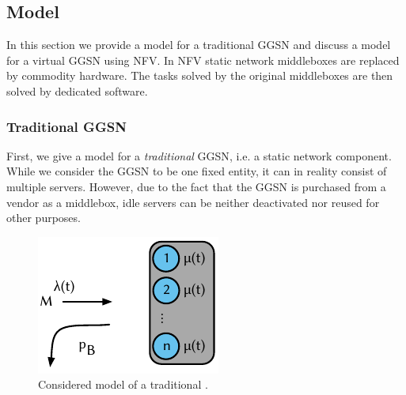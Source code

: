 \subsection{Model}\label{sec:cloud:virtualized_network_functions:model}

In this section we provide a model for a traditional \gls{GGSN} and discuss a model for a virtual \gls{GGSN} using \gls{NFV}.
In \gls{NFV} \cite{Nfv2013} static network middleboxes are replaced by commodity hardware.
The tasks solved by the original middleboxes are then solved by dedicated software.

\subsubsection*{Traditional GGSN}\label{sec:cloud:virtualized_network_functions:model:traditional_ggsn}
First, we give a model for a \emph{traditional} \gls{GGSN}, i.e. a static network component.
While we consider the \gls{GGSN} to be one fixed entity, it can in reality consist of multiple servers.
However, due to the fact that the \gls{GGSN} is purchased from a vendor as a middlebox, idle servers can be neither deactivated nor reused for other purposes.

\begin{figure}
  \centering
  \includegraphics{cloud/virtualized_network_functions/model/figures/traditional_ggsn}
  \caption{Considered model of a traditional .}
  \label{sec:cloud:virtualized_network_functions:model:traditional_ggsn:model}
\end{figure}

